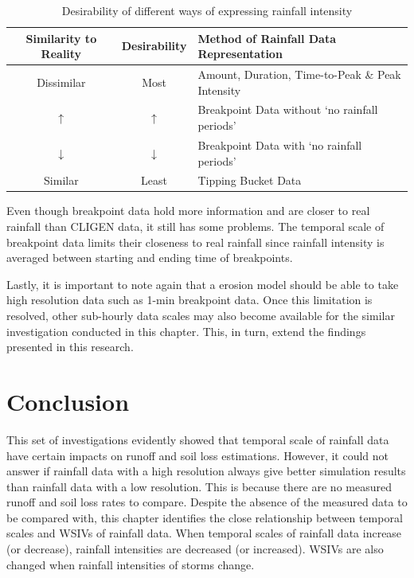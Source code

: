\begin{table}[htbp]
  \small
  \centering
      \caption{Desirability of different ways of expressing rainfall intensity}
  \label{tab:DesirabilityOfDifferentWaysOfExpressingRainfallIntensity}
    \begin{tabular}{ccl}
    \toprule
    Similarity to Reality & Desirability & Method of Rainfall Data
Representation\\
    \midrule
    Dissimilar & Most & Amount, Duration, Time-to-Peak \& Peak Intensity\\
    $\uparrow$ & $\uparrow$ &  Breakpoint Data without `no rainfall periods'\\
    $\downarrow$ & $\downarrow$ &  Breakpoint Data with `no rainfall periods'\\
    Similar & Least & Tipping Bucket Data\\
    \bottomrule
    \end{tabular}
\end{table}

Even though breakpoint data hold more information and are closer to real
rainfall than CLIGEN data, it still has some problems. The temporal scale of
breakpoint data limits their closeness to real rainfall since rainfall intensity
is averaged between starting and ending time of breakpoints.

Lastly, it is important to note again that a erosion model should be able
to take high resolution data such as 1-min breakpoint data. Once this
limitation is resolved, other sub-hourly data scales may also become available
for the similar investigation conducted in this chapter. This, in turn, extend
the findings presented in this research.

\section{Conclusion}
\label{sec:TemporalScalesConclusion}

This set of investigations evidently showed that temporal scale of rainfall data
have certain impacts on runoff and soil loss estimations. However, it could not
answer if rainfall data with a high resolution always give better simulation
results than rainfall data with a low resolution. This is because there are
no measured runoff and soil loss rates to compare. Despite the absence of the
measured data to be compared with, this chapter identifies the close
relationship between temporal scales and WSIVs of rainfall data. When temporal
scales of rainfall data increase (or decrease), rainfall intensities are
decreased (or increased). WSIVs are also changed when rainfall intensities of
storms change.

